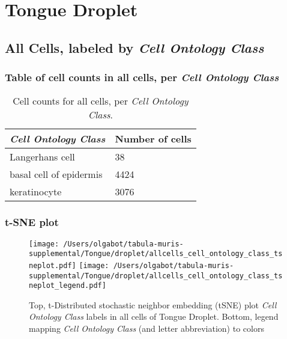 \clearpage
\section{Tongue Droplet}

\subsection{All Cells, labeled by \emph{Cell Ontology Class}}
\subsubsection{Table of cell counts in all cells, per \emph{Cell Ontology Class}}\begin{table}[h]
\centering
\label{my-label}
\begin{tabular}{@{}ll@{}}
\toprule

\emph{Cell Ontology Class}& Number of cells \\ \midrule
Langerhans cell & 38 \\

basal cell of epidermis & 4424 \\

keratinocyte & 3076 \\
\bottomrule
\end{tabular}
\caption{Cell counts for all cells, per \emph{Cell Ontology Class}.}
\end{table}

\clearpage
\subsubsection{t-SNE plot}
\begin{figure}[h]
\centering
\texttt{[image: /Users/olgabot/tabula-muris-supplemental/Tongue/droplet/allcells\_cell\_ontology\_class\_tsneplot.pdf]}
\texttt{[image: /Users/olgabot/tabula-muris-supplemental/Tongue/droplet/allcells\_cell\_ontology\_class\_tsneplot\_legend.pdf]}
\caption{Top, t-Distributed stochastic neighbor embedding (tSNE) plot  \emph{Cell Ontology Class} labels in all cells of Tongue Droplet. Bottom, legend mapping \emph{Cell Ontology Class} (and letter abbreviation) to colors}
\end{figure}


\clearpage

